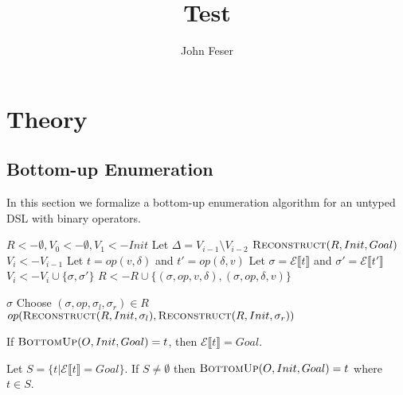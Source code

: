 \documentclass[review]{acmart}
\author{John Feser}
\title{Test}
\renewcommand{\eval}[1]{\ensuremath{\mathcal{E}\llbracket#1\rrbracket}}
\begin{document}
\section{Theory}
\subsection{Bottom-up Enumeration}

In this section we formalize a bottom-up enumeration algorithm for an untyped
DSL with binary operators.

\begin{algorithm}
  \begin{algorithmic}
    \State $R <- \emptyset, V_0 <- \emptyset, V_1 <- Init$
    \State Let $\Delta = V_{i - 1} \setminus V_{i - 2}$
    \State \Return $\Call{Reconstruct}{R, Init, Goal}$
    \EndIf
    \State $V_i <- V_{i - 1}$
    \State Let $t = op(v, \delta)$ and $t' = op(\delta, v)$
    \State Let $\sigma = \eval{t}$ and $\sigma' = \eval{t'}$
    \State $V_i <- V_i \cup \{\sigma, \sigma'\}$
    \State $R <- R \cup \{(\sigma, op, v, \delta), (\sigma, op, \delta, v)\}$
    \EndFor
    \EndFor
    \EndFunction
  \end{algorithmic}
\end{algorithm}

\begin{algorithm}
  \begin{algorithmic}
    \State \Return $\sigma$
    \EndIf
    \State Choose $(\sigma, op, \sigma_l, \sigma_r) \in R$
    \State \Return $op(\Call{Reconstruct}{R, Init, \sigma_l},
    \Call{Reconstruct}{R, Init, \sigma_r})$
    \EndFunction
  \end{algorithmic}
\end{algorithm}

\begin{theorem}[Soundness]
  If $\Call{BottomUp}{O, Init, Goal} = t$, then $\eval{t} = Goal$.
\end{theorem}

\begin{theorem}[Completeness]
  Let $S = \{t | \eval{t} = Goal\}$. If $S \neq \emptyset$ then
  $\Call{BottomUp}{O, Init, Goal} = t$ where $t \in S$.
\end{theorem}
\end{document}
